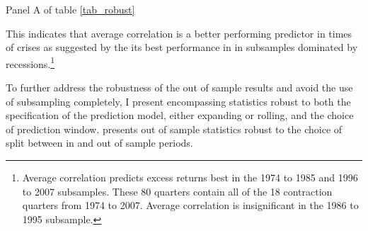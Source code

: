 Panel A of table \ref{tab_robust}

This indicates that average correlation is a better performing predictor in times of crises as suggested by the its best performance in \cite{pollet_average_2010} in subsamples dominated by recessions.\footnote{Average correlation predicts excess returns best in the 1974 to 1985 and 1996 to 2007 subsamples. These 80 quarters contain all of the 18 contraction quarters from 1974 to 2007. Average correlation is insignificant in the 1986 to 1995 subsample.} 

To further address the robustness of the out of sample results and avoid the use of subsampling completely, I present encompassing statistics robust to both the specification of the prediction model, either expanding or rolling, and the choice of prediction window. \cite{rossi_out--sample_2012} presents out of sample statistics robust to the choice of split between in and out of sample periods. 

